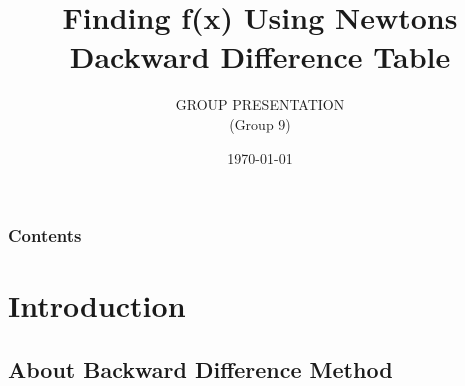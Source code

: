 \documentclass{beamer}
\title[Newtons Backward Difference]{Finding f(x) Using Newtons Dackward Difference Table} %
\author{GROUP PRESENTATION\\(Group 9)} %
\institute[] %
{\textbf{TEAM MEMBERS} \\ %
\textit{Nishitha Singh\\
Akanksha Panda\\
Geetha Sruthi Rudrapati\\
Harsimar Preet Kaur\\
Soumyodeep Nayak\\
Mayank Dey} %
}
\date{\today} %
\begin{document}
\begin{frame}
\titlepage %
\end{frame}

\begin{frame}
\frametitle{Contents} %
\tableofcontents %
\end{frame}


\section{Introduction} %

\subsection{About Backward Difference Method} %
\end{document}
